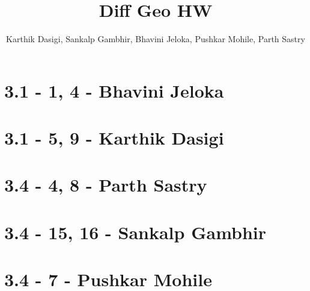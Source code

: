 \documentclass[aspectratio=169, handout]{beamer}
\title{Diff Geo HW}
\author{ %
    Karthik Dasigi,
    Sankalp Gambhir,
    Bhavini Jeloka,
    Pushkar Mohile, 
    Parth Sastry
}
\begin{document}
    \frame{\titlepage}

    \section{3.1 - 1, 4 - Bhavini Jeloka}
    
    

    \section{3.1 - 5, 9 - Karthik Dasigi}
    
    

    \section{3.4 - 4, 8 - Parth Sastry}
    
    

    \section{3.4 - 15, 16 - Sankalp Gambhir}
    
    

    \section{3.4 - 7 - Pushkar Mohile}
    

    \appendix
    
\end{document}
